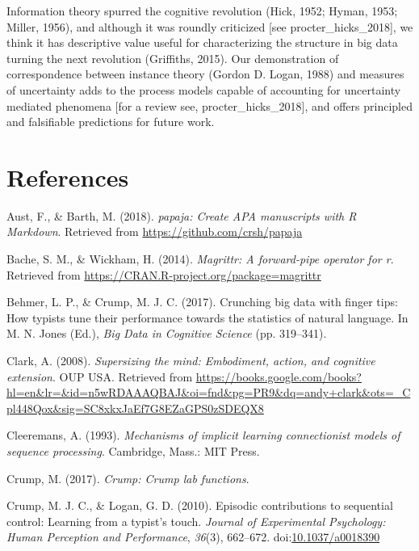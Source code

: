 \documentclass[floatsintext,man]{apa6}
\theoremstyle{definition}
\theoremstyle{definition}
\theoremstyle{definition}
\theoremstyle{remark}
\begin{document}
Information theory spurred the cognitive revolution (Hick, 1952; Hyman,
1953; Miller, 1956), and although it was roundly criticized {[}see
procter\_hicks\_2018{]}, we think it has descriptive value useful for
characterizing the structure in big data turning the next revolution
(Griffiths, 2015). Our demonstration of correspondence between instance
theory (Gordon D. Logan, 1988) and measures of uncertainty adds to the
process models capable of accounting for uncertainty mediated phenomena
{[}for a review see, procter\_hicks\_2018{]}, and offers principled and
falsifiable predictions for future work.

\newpage

\section{References}\label{references}

\begingroup
\setlength{\parindent}{-0.5in} \setlength{\leftskip}{0.5in}

\hypertarget{refs}{}
\hypertarget{ref-R-papaja}{}
Aust, F., \& Barth, M. (2018). \emph{papaja: Create APA manuscripts with
R Markdown}. Retrieved from \url{https://github.com/crsh/papaja}

\hypertarget{ref-R-magrittr}{}
Bache, S. M., \& Wickham, H. (2014). \emph{Magrittr: A forward-pipe
operator for r}. Retrieved from
\url{https://CRAN.R-project.org/package=magrittr}

\hypertarget{ref-behmer_crunching_2017}{}
Behmer, L. P., \& Crump, M. J. C. (2017). Crunching big data with finger
tips: How typists tune their performance towards the statistics of
natural language. In M. N. Jones (Ed.), \emph{Big Data in Cognitive
Science} (pp. 319--341).

\hypertarget{ref-clark_supersizing_2008}{}
Clark, A. (2008). \emph{Supersizing the mind: Embodiment, action, and
cognitive extension}. OUP USA. Retrieved from
\url{https://books.google.com/books?hl=en\&lr=\&id=n5wRDAAAQBAJ\&oi=fnd\&pg=PR9\&dq=andy+clark\&ots=_Cpl448Qox\&sig=SC8xkxJaEf7G8EZaGPS0zSDEQX8}

\hypertarget{ref-cleeremans_mechanisms_1993}{}
Cleeremans, A. (1993). \emph{Mechanisms of implicit learning
connectionist models of sequence processing}. Cambridge, Mass.: MIT
Press.

\hypertarget{ref-R-Crump}{}
Crump, M. (2017). \emph{Crump: Crump lab functions}.

\hypertarget{ref-crump_episodic_2010}{}
Crump, M. J. C., \& Logan, G. D. (2010). Episodic contributions to
sequential control: Learning from a typist's touch. \emph{Journal of
Experimental Psychology: Human Perception and Performance},
\emph{36}(3), 662--672.
doi:\href{https://doi.org/10.1037/a0018390}{10.1037/a0018390}
\end{document}
